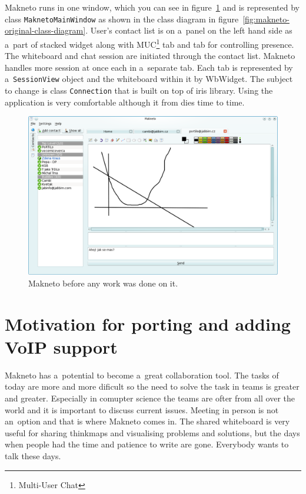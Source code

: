 Makneto runs in one window, which you can see in figure~\ref{fig:makneto-original} and is represented by class \verb|MaknetoMainWindow| as shown in the class diagram in figure~\ref{fig:makneto-original-class-diagram}. User's contact list is on a~panel on the left hand side as a~part of stacked widget along with MUC\footnote{Multi-User Chat} tab and tab for controlling presence. The whiteboard and chat session are initiated through the contact list. Makneto handles more session at once each in a~separate tab. Each tab is represented by a~\verb|SessionView| object and the whiteboard within it by WbWidget. The subject to change is class \verb|Connection| that is built on top of iris library. Using the application is very comfortable although it from dies time to time.


\begin{figure}[ht]
\begin{center}
	\includegraphics[width=15cm]{fig/makneto-original.png}
	\caption{Makneto before any work was done on it.}
	\label{fig:makneto-original}
\end{center}
\end{figure}


\section{Motivation for porting and adding VoIP support}
Makneto has a~potential to become a~great collaboration tool. The tasks of today are more and more dificult so the need to solve the task in teams is greater and greater. Especially in comupter science the teams are ofter from all over the world and it is important to discuss current issues. Meeting in person is not an~option and that is where Makneto comes in. The shared whiteboard is very useful for sharing thinkmaps and visualising problems and solutions, but the days when people had the time and patience to write are gone. Everybody wants to talk these days.  

